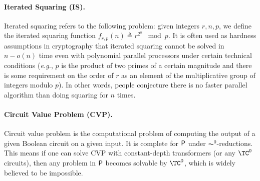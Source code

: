 



\newcommand{\sq}{\mathsf{sq}}

\paragraph{Iterated Squaring (IS).}  Iterated squaring refers to the following problem: given integers $r,n,p$, we define the iterated squaring function $f_{r,p}(n)\triangleq r^{2^n} \mod p$. It is often used as hardness assumptions in cryptography \citep{rivest1996time,lombardi2020fiat} that iterated squaring cannot be solved in $n-o(n)$ time even with polynomial parallel processors under certain technical conditions (\emph{e.g.}, $p$ is the product of two primes of a certain magnitude and there is some requirement on the order of $r$ as an element of the multiplicative group of integers modulo $p$). In other words, people conjecture there is no faster parallel algorithm than doing squaring for $n$ times.

\paragraph{Circuit Value Problem (CVP).} Circuit value problem is the computational problem of computing the output of a given Boolean circuit on a given input. It is complete for $\P$ under $\AC^0$-reductions. This means if one can solve CVP with constant-depth transformers (or any $\TC^0$ circuits), then any problem in $\P$ becomes solvable by $\TC^0$, which is widely believed to be impossible.




